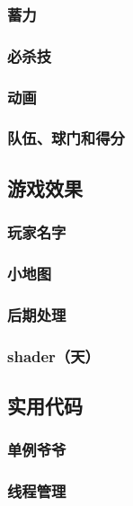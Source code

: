 \documentclass[conference]{IEEEtran}
\begin{document}
\subsubsection{蓄力}
\subsubsection{必杀技}
\subsubsection{动画}
\subsubsection{队伍、球门和得分}


\subsection{游戏效果}
\subsubsection{玩家名字}
\subsubsection{小地图}
\subsubsection{后期处理}
\subsubsection{shader（天）}


\subsection{实用代码}
\subsubsection{单例爷爷}
\subsubsection{线程管理}
\end{document}
